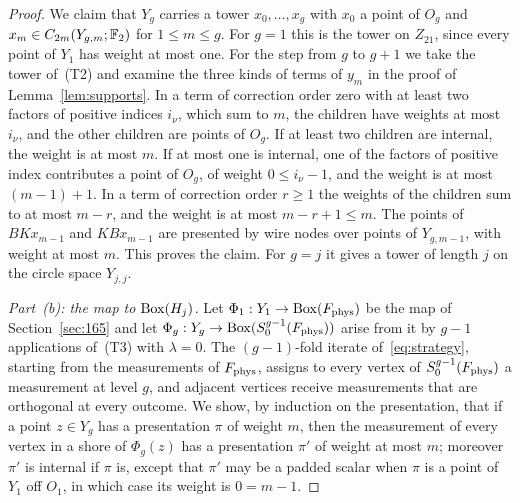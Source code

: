 \begin{proof}
We claim that $Y_g$ carries a tower $x_0,\ldots,x_g$ with $x_0$ a point of $O_g$ and $x_m\in C_{2m}(Y_{g,m};\mathbb F_2)$ for $1\le m\le g$. For $g=1$ this is the tower on $Z_{21}$, since every point of $Y_1$ has weight at most one. For the step from $g$ to $g+1$ we take the tower of~(T2) and examine the three kinds of terms of $y_m$ in the proof of Lemma~\ref{lem:supports}. In a term of correction order zero with at least two factors of positive indices $i_\nu$, which sum to $m$, the children have weights at most $i_\nu$, and the other children are points of $O_g$. If at least two children are internal, the weight is at most $m$. If at most one is internal, one of the factors of positive index contributes a point of $O_g$, of weight $0\le i_\nu-1$, and the weight is at most $(m-1)+1$. In a term of correction order $r\ge1$ the weights of the children sum to at most $m-r$, and the weight is at most $m-r+1\le m$. The points of $BKx_{m-1}$ and $KBx_{m-1}$ are presented by wire nodes over points of $Y_{g,m-1}$, with weight at most $m$. This proves the claim. For $g=j$ it gives a tower of length $j$ on the circle space $Y_{j,j}$.

\emph{Part~\textup{(b)}: the map to $\operatorname{Box}(H_j)$.} Let $\Phi_1:Y_1\to\operatorname{Box}(F_{\rm phys})$ be the map of Section~\ref{sec:165} and let $\Phi_g:Y_g\to\operatorname{Box}(S^{g-1}_0(F_{\rm phys}))$ arise from it by $g-1$ applications of~(T3) with $\lambda=0$. The $(g-1)$-fold iterate of~\eqref{eq:strategy}, starting from the measurements of $F_{\rm phys}$, assigns to every vertex of $S^{g-1}_0(F_{\rm phys})$ a measurement at level $g$, and adjacent vertices receive measurements that are orthogonal at every outcome. We show, by induction on the presentation, that if a point $z\in Y_g$ has a presentation $\pi$ of weight $m$, then the measurement of every vertex in a shore of $\Phi_g(z)$ has a presentation $\pi'$ of weight at most $m$; moreover $\pi'$ is internal if $\pi$ is, except that $\pi'$ may be a padded scalar when $\pi$ is a point of $Y_1$ off $O_1$, in which case its weight is $0=m-1$.


\end{proof}
